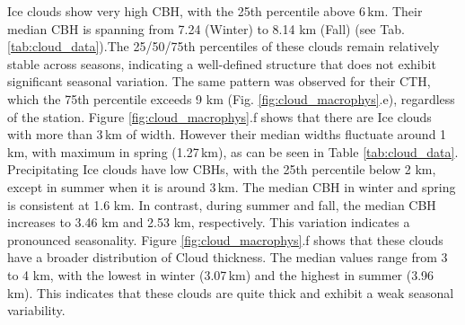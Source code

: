 Ice clouds show very high CBH, with the 25th percentile above 6\,km. Their median CBH is spanning from 7.24 (Winter) to 8.14 km (Fall) (see Tab. \ref{tab:cloud_data}).The 25/50/75th percentiles of these clouds remain relatively stable across seasons, indicating a well-defined structure that does not exhibit significant seasonal variation. The same pattern was observed for their CTH, which the 75th percentile exceeds 9 km (Fig. \ref{fig:cloud_macrophys}.e), regardless of the station. Figure \ref{fig:cloud_macrophys}.f shows that there are Ice clouds with more than 3\,km of width. However their median widths fluctuate around 1\,km, with maximum in spring (1.27\,km), as can be seen in Table \ref{tab:cloud_data}. Precipitating Ice clouds have low CBHs, with the 25th percentile below 2 km, except in summer when it is around 3\,km. The median CBH in winter and spring is consistent at 1.6 km. In contrast, during summer and fall, the median CBH increases to 3.46 km and 2.53 km, respectively. This variation indicates a pronounced seasonality. Figure \ref{fig:cloud_macrophys}.f shows that these clouds have a broader distribution of Cloud thickness. The median values range from 3 to 4 km, with the lowest in winter (3.07\,km) and the highest in summer (3.96\,km). This indicates that these clouds are quite thick and exhibit a weak seasonal variability. 

